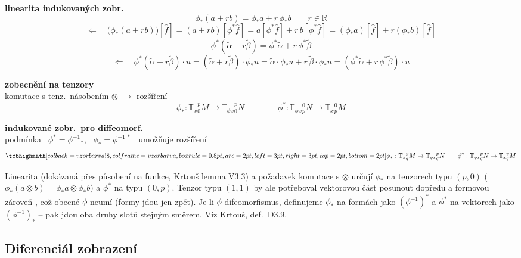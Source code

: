 \textbf{linearita indukovaných zobr.}
\[
  \phi_*(a + rb) = \phi_*a + r\,\phi_*b \qquad r\in\mathbb{R}
\]
\[
  \Leftarrow\quad \big(\phi_*(a+rb)\big)[\hat f] = (a+rb)[\phi^*\hat f] = a[\phi^*\hat f] + r\,b[\phi^*\hat f] = (\phi_*a)[\hat f] + r(\phi_*b)[\hat f]
\]
\[
  \phi^*(\tilde\alpha + r\tilde\beta) = \phi^*\tilde\alpha + r\,\phi^*\tilde\beta
\]
\[
  \Leftarrow\quad \phi^*(\tilde\alpha + r\tilde\beta)\cdot u = (\tilde\alpha + r\tilde\beta)\cdot\phi_*u = \tilde\alpha\cdot\phi_*u + r\,\tilde\beta\cdot\phi_*u = (\phi^*\tilde\alpha + r\,\phi^*\tilde\beta)\cdot u
\]

\textbf{zobecnění na tenzory} \\
\quad komutace s tenz.\ násobením $\otimes$ $\to$ rozšíření
\[
  \phi_*: \mathbb{T}_x{}^p_0M\to\mathbb{T}_{\phi x}{}^p_0N \qquad\qquad
  \phi^*: \mathbb{T}_{\phi x}{}^0_pN\to\mathbb{T}_x{}^0_pM
\]
\quad {}

\textbf{indukované zobr.\ pro diffeomorf.} \\
\quad podmínka \ $\phi^* = \phi^{-1}{}_*$, \ $\phi_* = \phi^{-1\,*}$ \ umožňuje rozšíření
\[
  \vzorec{\phi_*: \mathbb{T}_x{}^p_qM\to\mathbb{T}_{\phi x}{}^p_qN \qquad
  \phi^*: \mathbb{T}_{\phi x}{}^p_qN\to\mathbb{T}_x{}^p_qM}
\]

\begin{vysvetleni}
Linearita (dokázaná přes působení na funkce, Krtouš lemma V3.3) a požadavek komutace s $\otimes$ určují $\phi_*$ na tenzorech typu $(p,0)$ ($\phi_*(a\otimes b)=\phi_*a\otimes\phi_*b$) a $\phi^*$ na typu $(0,p)$. Tenzor typu $(1,1)$ by ale potřeboval vektorovou část posunout dopředu a formovou zároveň , což obecné $\phi$ neumí (formy jdou jen zpět). Je-li $\phi$ difeomorfismus, definujeme $\phi_*$ na formách jako $(\phi^{-1})^*$ a $\phi^*$ na vektorech jako $(\phi^{-1})_*$ -- pak jdou oba druhy slotů stejným směrem. Viz Krtouš, def.\ D3.9.
\end{vysvetleni}

\subsection{Diferenciál zobrazení}
\providecommand{\gmIsestAta}{\tilde{\underline{a}}}
\providecommand{\gmIsestAtk}{\tilde{\underline{k}}}
\providecommand{\gmIsestAm}{\underline{m}}

